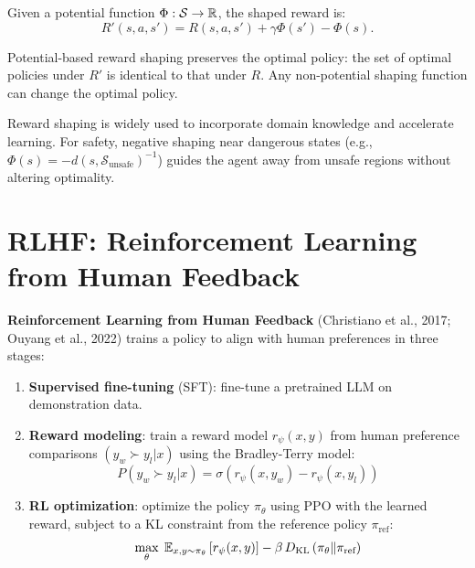 \begin{definition}
Given a potential function $\Phi: \mathcal{S} \to \mathbb{R}$, the shaped reward is:
\[
    R'(s, a, s') = R(s, a, s') + \gamma \Phi(s') - \Phi(s).
\]
\end{definition}

\begin{theorem}[Ng et al., 1999]
Potential-based reward shaping preserves the optimal policy: the set of
optimal policies under $R'$ is identical to that under $R$. Any non-potential
shaping function can change the optimal policy.
\end{theorem}

\begin{remark}
Reward shaping is widely used to incorporate domain knowledge and
accelerate learning. For safety, negative shaping near dangerous states
(e.g., $\Phi(s) = -d(s, \mathcal{S}_{\text{unsafe}})^{-1}$) guides the
agent away from unsafe regions without altering optimality.
\end{remark}

\section{RLHF: Reinforcement Learning from Human Feedback}
\label{sec:rlhf}

\begin{definition}[RLHF]
\textbf{Reinforcement Learning from Human Feedback} (Christiano et al.,
2017; Ouyang et al., 2022) trains a policy to align with human
preferences in three stages:
\begin{enumerate}
    \item \textbf{Supervised fine-tuning} (SFT): fine-tune a pretrained
    LLM on demonstration data.
    \item \textbf{Reward modeling}: train a reward model $r_\psi(x, y)$
    from human preference comparisons $(y_w \succ y_l | x)$ using the
    Bradley-Terry model:
    \[
        P(y_w \succ y_l | x) = \sigma\left(r_\psi(x, y_w) - r_\psi(x, y_l)\right)
    \]
    \item \textbf{RL optimization}: optimize the policy $\pi_\theta$ using
    PPO with the learned reward, subject to a KL constraint from the
    reference policy $\pi_{\text{ref}}$:
    \[
        \max_\theta \; \mathbb{E}_{x, y \sim \pi_\theta}\left[r_\psi(x, y)\right]
        - \beta \, D_{\text{KL}}\left(\pi_\theta \| \pi_{\text{ref}}\right)
    \]
\end{enumerate}
\end{definition}

